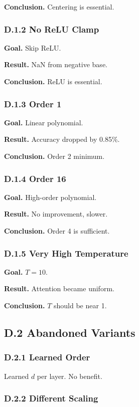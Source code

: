 \textbf{Conclusion.} Centering is essential.

\subsubsection{D.1.2 No ReLU Clamp}

\textbf{Goal.} Skip ReLU.

\textbf{Result.} NaN from negative base.

\textbf{Conclusion.} ReLU is essential.

\subsubsection{D.1.3 Order 1}

\textbf{Goal.} Linear polynomial.

\textbf{Result.} Accuracy dropped by 0.85\%.

\textbf{Conclusion.} Order 2 minimum.

\subsubsection{D.1.4 Order 16}

\textbf{Goal.} High-order polynomial.

\textbf{Result.} No improvement, slower.

\textbf{Conclusion.} Order 4 is sufficient.

\subsubsection{D.1.5 Very High Temperature}

\textbf{Goal.} $T = 10$.

\textbf{Result.} Attention became uniform.

\textbf{Conclusion.} $T$ should be near 1.

\subsection{D.2 Abandoned Variants}

\subsubsection{D.2.1 Learned Order}

Learned $d$ per layer. No benefit.

\subsubsection{D.2.2 Different Scaling}


